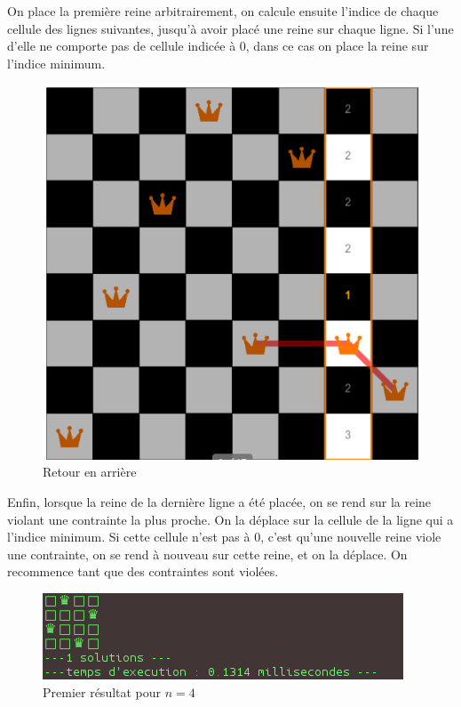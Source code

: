 \documentclass{article}
\begin{document}
On place la première reine arbitrairement, on calcule ensuite l'indice de chaque cellule des lignes suivantes, jusqu'à avoir placé une reine sur chaque ligne. Si l'une d'elle ne comporte pas de cellule indicée à 0, dans ce cas on place la reine sur l'indice minimum. 

\begin{figure}[!h]
	\caption{\label{local3} Retour en arrière}
	\begin{center}
	\includegraphics[scale=0.3]{./picture/local3.png}
	\end{center}
\end{figure}

Enfin, lorsque la reine de la dernière ligne a été placée, on se rend sur la reine violant une contrainte la plus proche. On la déplace sur la cellule de la ligne qui a l'indice minimum. Si cette cellule n'est pas à 0, c'est qu'une nouvelle reine viole une contrainte, on se rend à nouveau sur cette reine, et on la déplace. On recommence tant que des contraintes sont violées. 

\begin{figure}[h]
\caption{\label{local4} Premier résultat pour $n = 4$}
\begin{center}
\includegraphics[scale=0.5]{./picture/local_4.png}
\end{center}
\end{figure}
\end{document}
